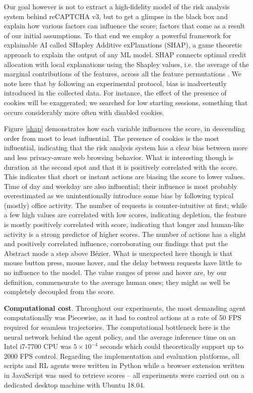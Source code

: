 Our goal however is not to extract a high-fidelity model of the risk analysis system behind reCAPTCHA v3, but to get a glimpse in the black box and explain how various factors can influence the score; factors that come as a result of our initial assumptions.
To that end we employ a powerful framework for explainable AI called SHapley Additive exPlanations (SHAP), a game theoretic approach to explain the output of any \gls{ML} model.
SHAP connects optimal credit allocation with local explanations using the Shapley values, i.e. the average of the marginal contributions of the features, across all the feature permutations \cite{lundberg2017unified}.
We note here that by following an experimental protocol, bias is inadvertently introduced in the collected data.
For instance, the effect of the presence of cookies will be exaggerated; we searched for low starting sessions, something that occurs considerably more often with disabled cookies.

Figure \ref{shap} demonstrates how each variable influences the score, in descending order from most to least influential.
The presence of cookies is the most influential, indicating that the risk analysis system has a clear bias between more and less privacy-aware web browsing behavior.
What is interesting though is duration at the second spot and that it is positively correlated with the score.
This indicates that short or instant actions are biasing the score to lower values.
Time of day and weekday are also influential; their influence is most probably overestimated as we unintentionally introduce some bias by following typical (mostly) office activity.
The number of requests is counter-intuitive at first; while a few high values are correlated with low scores, indicating depletion, the feature is mostly positively correlated with score, indicating that longer and human-like activity is a strong predictor of higher scores.
The number of actions has a slight and positively correlated influence, corroborating our findings that put the Abstract mode a step above Bézier.
What is unexpected here though is that mouse button press, mouse hover, and the delay between requests have little to no influence to the model.
The value ranges of press and hover are, by our definition, commensurate to the average human ones; they might as well be completely decoupled from the score. 

\textbf{Computational cost}. Throughout our experiments, the most demanding agent computationally was Piecewise, as it had to control actions at a rate of 50 FPS required for seamless trajectories.
The computational bottleneck here is the neural network behind the agent policy, and the average inference time on an Intel i7-7700 CPU was $5 \times 10^{-4}$ seconds which could theoretically support up to 2000 FPS control.
Regarding the implementation and evaluation platforms, all scripts and \gls{RL} agents were written in Python while a browser extension written in JavaScript was used to retrieve scores -- all experiments were carried out on a dedicated desktop machine with Ubuntu 18.04.

